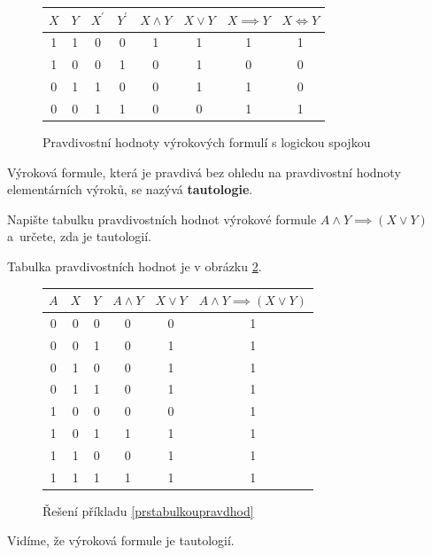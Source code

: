 \begin{figure}[h]
\centering
\begin{tabular}{c c | c c | c c c c}
    $X$ & $Y$ & $X^\prime$ & $Y^\prime$ & $X\land Y$ & $X\lor Y$ & $X\implies Y$ & $X\iff Y$ \\
    \hline
    1 & 1 & 0 & 0 & 1 & 1 & 1 & 1 \\
    1 & 0 & 0 & 1 & 0 & 1 & 0 & 0 \\
    0 & 1 & 1 & 0 & 0 & 1 & 1 & 0 \\
    0 & 0 & 1 & 1 & 0 & 0 & 1 & 1 \\
\end{tabular}
\caption{Pravdivostní hodnoty výrokových formulí s logickou spojkou}
\label{pravdhod}
\end{figure}

\begin{definition}
  Výroková formule, která je pravdivá bez ohledu na pravdivostní hodnoty elementárních výroků, se nazývá \textbf{tautologie}.
\end{definition}

\begin{priklad}\label{prstabulkoupravdhod}
    Napište tabulku pravdivostních hodnot výrokové formule $A\land Y \implies (X\lor Y)$ a~určete,
    zda je tautologií.
\end{priklad}

\begin{reseni}
Tabulka pravdivostních hodnot je v obrázku \ref{tabulkaresenipr}.
  \begin{figure}[h]
	\centering
	\begin{tabular}{c c c | c c | c}
      $A$ & $X$ & $Y$ & $A \land Y$ & $X \lor Y$ & $A\land Y \implies (X\lor Y)$ \\
      \hline
      0 & 0 & 0 & 0 & 0 & 1  \\
      0 & 0 & 1 & 0 & 1 & 1  \\
      0 & 1 & 0 & 0 & 1 & 1  \\
      0 & 1 & 1 & 0 & 1 & 1  \\
      1 & 0 & 0 & 0 & 0 & 1  \\
      1 & 0 & 1 & 1 & 1 & 1  \\
      1 & 1 & 0 & 0 & 1 & 1  \\
      1 & 1 & 1 & 1 & 1 & 1  \\
    \end{tabular}
	\caption{Řešení příkladu \ref{prstabulkoupravdhod}}
	\label{tabulkaresenipr}
  \end{figure}
  Vidíme, že výroková formule je tautologií.
\end{reseni}



